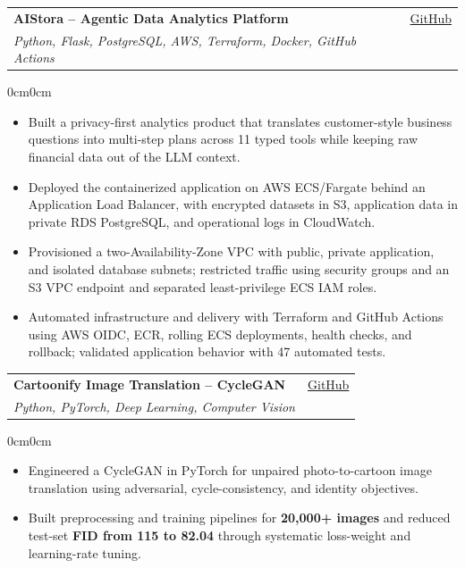 \documentclass[10pt, letterpaper]{article}
\newenvironment{highlights}{
    \begin{itemize}[
        topsep=0.04cm,
        parsep=0.02cm,
        partopsep=0pt,
        itemsep=0.03cm,
        leftmargin=12pt
    ]
}{
    \end{itemize}
}
\newenvironment{onecolentry}{
    \begin{adjustwidth}{0cm}{0cm}
}{
    \end{adjustwidth}
}
\begin{document}
\begin{tabularx}{\textwidth}{Xr}
    \textbf{AIStora -- Agentic Data Analytics Platform}
        & \href{https://github.com/JamieWei213213/AiStora}{GitHub}\\
    \textit{Python, Flask, PostgreSQL, AWS, Terraform, Docker, GitHub Actions}
        & \\
\end{tabularx}

\begin{onecolentry}
\begin{highlights}
    \item Built a privacy-first analytics product that translates customer-style
    business questions into multi-step plans across 11 typed tools while keeping
    raw financial data out of the LLM context.
    \item Deployed the containerized application on AWS ECS/Fargate behind an
    Application Load Balancer, with encrypted datasets in S3, application data
    in private RDS PostgreSQL, and operational logs in CloudWatch.
    \item Provisioned a two-Availability-Zone VPC with public, private application,
    and isolated database subnets; restricted traffic using security groups and
    an S3 VPC endpoint and separated least-privilege ECS IAM roles.
    \item Automated infrastructure and delivery with Terraform and GitHub Actions
    using AWS OIDC, ECR, rolling ECS deployments, health checks, and rollback;
    validated application behavior with 47 automated tests.
\end{highlights}
\end{onecolentry}

\vspace{0.10cm}

\begin{tabularx}{\textwidth}{Xr}
    \textbf{Cartoonify Image Translation -- CycleGAN}
        & \href{https://github.com/JamieWei213213/Cartoonify}{GitHub}\\
    \textit{Python, PyTorch, Deep Learning, Computer Vision}
        & \\
\end{tabularx}

\begin{onecolentry}
\begin{highlights}
    \item Engineered a CycleGAN in PyTorch for unpaired photo-to-cartoon image
    translation using adversarial, cycle-consistency, and identity objectives.
    \item Built preprocessing and training pipelines for \textbf{20,000+ images}
    and reduced test-set \textbf{FID from 115 to 82.04} through systematic
    loss-weight and learning-rate tuning.
\end{highlights}
\end{onecolentry}
\end{document}
